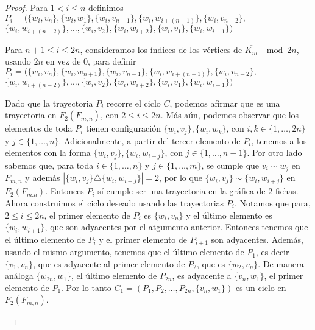\begin{proof}
    Para $1 < i \leq n$ definimos
    $P_i=(\{w_i,v_n\},\{w_i,w_1\},\{w_i,v_{n-1}\},\{w_i,w_{i+(n-1)}\},\{w_i,v_{n-2}\},$
    $\{w_i,w_{i+(n-2)}\},\dots,\{w_i,v_2\},\{w_i,w_{i+2}\},\{w_i,v_1\},\{w_i,w_{i+1}\})$

    Para $n+1\leq i \leq 2n$, consideramos los \'indices de los v\'ertices de
    $\overline{K_m}$ $\mod 2n$, usando $2n$ en vez de $0$, para definir
    $P_i=(\{w_i,v_n\},\{w_i,w_{n+1}\},\{w_i,v_{n-1}\},\{w_i,w_{i+(n-1)}\},\{w_i,v_{n-2}\},$
    $\{w_i,w_{i+(n-2)}\},\dots,
    \{w_i,v_2\},\{w_i,w_{i+2}\},\{w_i,v_1\},\{w_i,w_{i+1}\})$

    Dado que la trayectoria $P_i$ recorre el ciclo $C$, podemos afirmar que es
    una trayectoria en $F_2(F_{m,n})$, con $2\leq i \leq 2n$. M\'as a\'un,
    podemos observar que los elementos de toda $P_i$ tienen configuraci\'on
    $\{w_i,v_j\},\{w_i,w_k\}$, con $i, k\in \{1, \dots, 2n\}$ y $j \in \{1,
    \dots, n\}$. Adicionalmente, a partir del tercer elemento de $P_i$, tenemos a
    los elementos con la forma $\{w_i,v_j\},\{w_i,w_{i+j}\}$, con $j \in \{1,
    \dots, n-1\}$.  Por otro lado sabemos que, para toda $i \in \{1, \dots, n\}$
    y $j \in \{1, \dots, m\}$, se cumple que $v_i \sim w_j$ en $F_{m,n}$ y
    adem\'as $|\{w_i,v_j\} \triangle \{w_i, w_{i+j}\}|=2$, por lo que
    $\{w_i,v_j\} \sim \{w_i, w_{i+j}\}$ en $F_2(F_{m.n})$. Entonces $P_i$ s\'i
    cumple ser una trayectoria en la gr\'afica de $2$-fichas. Ahora construimos
    el ciclo deseado usando las trayectorias $P_i$. Notamos que para, $2 \leq i
    \leq 2n$, el primer elemento de $P_i$ es $\{w_i, v_n\}$ y el \'ultimo
    elemento es $\{w_i, w_{i+1}\}$, que son adyacentes por el atgumento
    anterior. Entonces tenemos que el \'ultimo elemento de $P_i$ y el primer
    elemento de $P_{i+1}$ son adyacentes. Adem\'as, usando el mismo argumento,
    tenemos que el \'ultimo elemento de $P_1$, es decir $\{v_1,v_n\}$, que es
    adyacente al primer elemento de $P_2$, que es $\{w_2,v_n\}$. De manera
    an\'aloga $\{w_{2n},w_1\}$, el \'ultimo elemento de $P_{2n}$, es adyacente a
    $\{v_n,w_1\}$, el primer elemento de $P_1$. Por lo tanto $C_1 = (P_1,P_2,
    \dots, P_{2n},\{v_n,w_1\})$ es un ciclo en $F_2(F_{m,n})$. 

    \begin{figure}[ht!]
        \centering
           \begin{tikzpicture}
        

\end{tikzpicture}
\end{figure}
\end{proof}
